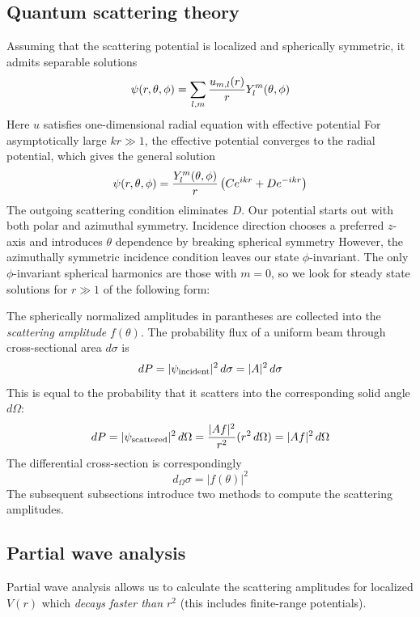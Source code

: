 \subsection{Quantum scattering theory}
Assuming that the scattering potential is localized and spherically symmetric, 
it admits separable solutions 
\[ 
    \psi(r, \theta, \phi) = \sum_{l, m} \dfrac{u_{m, l}(r)}{r} Y^m_l(\theta, \phi)
\] 
Here $u$ satisfies one-dimensional radial equation with effective potential 
For asymptotically large $kr\gg 1$, the effective potential converges to the radial potential, 
which gives the general solution 
\[ 
    \psi(r, \theta, \phi) = \dfrac{Y^m_l(\theta, \phi)}r\left(Ce^{ikr} + De^{-ikr}\right)
\] 
The outgoing scattering condition eliminates $D$. Our potential starts out 
with both polar and azimuthal symmetry. 
Incidence direction chooses a preferred $z$-axis and 
introduces $\theta$ dependence by breaking spherical symmetry
However, the azimuthally symmetric incidence condition 
leaves our state $\phi$-invariant. 
The only $\phi$-invariant spherical harmonics are those with $m=0$, so 
we look for steady state solutions for $r\gg 1$ of the following form: 
\begin{mdframed}
\end{mdframed}
The spherically normalized amplitudes in parantheses are collected into the 
\textit{scattering amplitude} $f(\theta)$. 
The probability flux of a uniform 
beam through cross-sectional area $d\sigma$ is 
\[ 
    dP = |\psi_{\mathrm{incident}}|^2\, d\sigma = |A|^2 \, d\sigma 
\] 
This is equal to the probability that it scatters into the 
corresponding solid angle $d\Omega$: 
\[ 
    dP = |\psi_{\mathrm{scattered}}|^2\, d\Omega = \dfrac{|Af|^2}{r^2} (r^2\, d\Omega)
    = |Af|^2\, d\Omega 
\] 
The differential cross-section is correspondingly 
\[ 
    d_\Omega \sigma = |f(\theta)|^2
\] 
The subsequent subsections introduce two methods to compute the 
scattering amplitudes. 


\subsection{Partial wave analysis}
Partial wave analysis allows us to calculate the scattering amplitudes 
for localized $V(r)$ which \textit{decays faster than $r^2$} 
(this includes finite-range potentials). 

